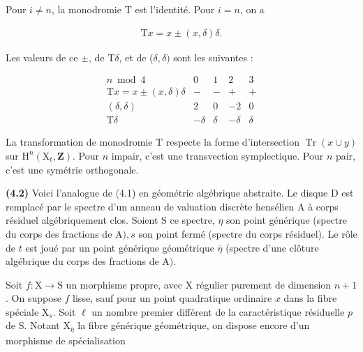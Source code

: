 \documentclass[10pt,leqno]{article}
\begin{document}
\noindent Pour \(i\ne n\), la monodromie \(\mathrm{T}\) est l’identité. Pour \(i=n\), on a\par

\begin{equation*}\begin{gathered}\mathrm{T}x = x \pm  (x,\delta )\delta .\end{gathered}\end{equation*}

\noindent Les valeurs de ce \(\pm \), de \(\mathrm{T}\delta \), et de (\(\delta ,\delta )\) sont les suivantes :\par

\[\begin{array}{crrrr}n\bmod4&0&1&2&3\\ \mathrm Tx=x\pm(x,\delta)\delta&-&-&+&+\\ (\delta,\delta)&2&0&-2&0\\ \mathrm T\delta&-\delta&\delta&-\delta&\delta\end{array}\]

\clearpage

\label{physical-17}

\noindent La transformation de monodromie \(\mathrm{T}\) respecte la forme d’intersection \(\operatorname{Tr}(x\cup y)\) sur \(\mathrm{H}^{n}(\mathrm{X}_{t},\mathbf{Z})\). Pour \(n\) impair, c’est une transvection symplectique. Pour \(n\) pair, c’est une symétrie orthogonale.\par

\noindent \textbf{(4.2)} Voici l’analogue de (4.1) en géométrie algébrique abstraite. Le disque \(\mathrm{D}\) est remplacé par le spectre d’un anneau de valuation discrète hensélien \(\mathrm{A}\) à corps résiduel algébriquement clos. Soient \(\mathrm{S}\) ce spectre, \(\eta \) son point générique (spectre du corps des fractions de \(\mathrm{A}), s\) son point fermé (spectre du corps résiduel). Le rôle de \(t\) est joué par un point générique géométrique \(\overline{\eta }\) (spectre d’une clôture algébrique du corps des fractions de \(\mathrm{A})\).\par

\noindent Soit \(f : \mathrm{X}\longrightarrow \mathrm{S}\) un morphisme propre, avec \(\mathrm{X}\) régulier purement de dimension \(n+1\). On suppose \(f\) lisse, sauf pour un point quadratique ordinaire \(x\) dans la fibre spéciale \(\mathrm{X}_{s}\). Soit \(\ell \) un nombre premier différent de la caractéristique résiduelle \(p\) de \(\mathrm{S}\). Notant \(\mathrm{X}_{\overline{\eta }}\) la fibre générique géométrique, on dispose encore d’un morphisme de spécialisation\par
\end{document}
